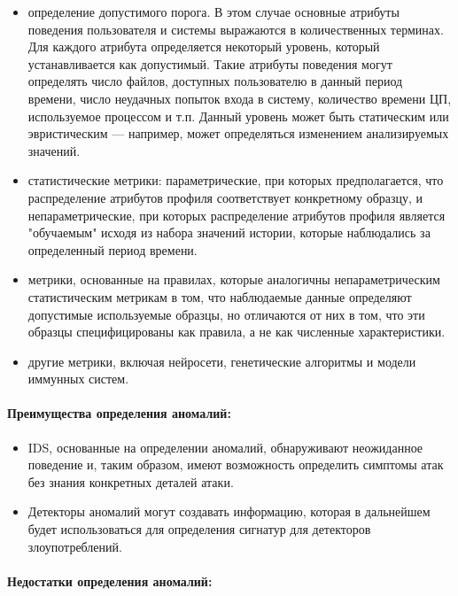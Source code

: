 \begin{itemize}
	\item определение допустимого порога. В этом случае основные атрибуты поведения
	пользователя и системы выражаются в количественных терминах. Для каждого атрибута
	определяется некоторый уровень, который устанавливается как допустимый. Такие атрибуты
	поведения могут определять число файлов, доступных пользователю в данный период времени,
	число неудачных попыток входа в систему, количество времени ЦП, используемое процессом и
	т.п. Данный уровень может быть статическим или эвристическим — например, может определяться
	изменением анализируемых значений.

	\item статистические метрики: параметрические, при которых предполагается, что распределение
	атрибутов профиля соответствует конкретному образцу, и непараметрические, при которых
	распределение атрибутов профиля является "обучаемым" исходя из набора значений истории,
	которые наблюдались за определенный период времени.

	\item метрики, основанные на правилах, которые аналогичны непараметрическим статистическим
	метрикам в том, что наблюдаемые данные определяют допустимые используемые образцы, но
	отличаются от них в том, что эти образцы специфицированы как правила, а не как численные
	характеристики.

	\item другие метрики, включая нейросети, генетические алгоритмы и модели иммунных систем.
\end{itemize}


\paragraph*{Преимущества определения аномалий:}

\begin{itemize}
	\item IDS, основанные на определении аномалий, обнаруживают неожиданное поведение и,
	таким образом, имеют возможность определить симптомы атак без знания конкретных деталей атаки.

	\item Детекторы аномалий могут создавать информацию, которая в дальнейшем будет
	использоваться для определения сигнатур для детекторов злоупотреблений.
\end{itemize}


\paragraph*{Недостатки определения аномалий:}

